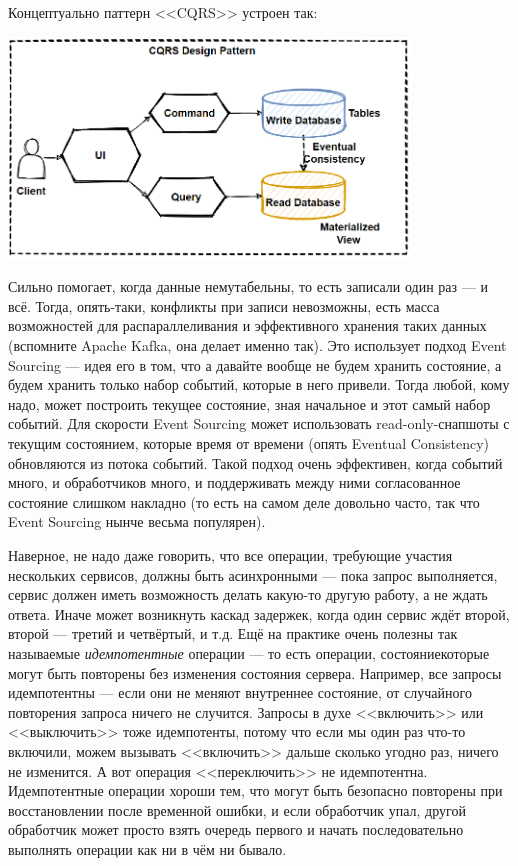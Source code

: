 \documentclass{../../text-style}
\begin{document}
Концептуально паттерн <<CQRS>> устроен так:

\begin{center}
    \includegraphics[width=0.8\textwidth]{cqrs.png}
\end{center}

Сильно помогает, когда данные немутабельны, то есть записали один раз --- и всё. Тогда, опять-таки, конфликты при записи невозможны, есть масса возможностей для распараллеливания и эффективного хранения таких данных (вспомните Apache Kafka, она делает именно так). Это использует подход Event Sourcing --- идея его в том, что а давайте вообще не будем хранить состояние, а будем хранить только набор событий, которые в него привели. Тогда любой, кому надо, может построить текущее состояние, зная начальное и этот самый набор событий. Для скорости Event Sourcing может использовать read-only-снапшоты с текущим состоянием, которые время от времени (опять Eventual Consistency) обновляются из потока событий. Такой подход очень эффективен, когда событий много, и обработчиков много, и поддерживать между ними согласованное состояние слишком накладно (то есть на самом деле довольно часто, так что Event Sourcing нынче весьма популярен).

Наверное, не надо даже говорить, что все операции, требующие участия нескольких сервисов, должны быть асинхронными --- пока запрос выполняется, сервис должен иметь возможность делать какую-то другую работу, а не ждать ответа. Иначе может возникнуть каскад задержек, когда один сервис ждёт второй, второй --- третий и четвёртый, и т.д. Ещё на практике очень полезны так называемые \emph{идемпотентные} операции --- то есть операции, состояниекоторые могут быть повторены без изменения состояния сервера. Например, все запросы идемпотентны --- если они не меняют внутреннее состояние, от случайного повторения запроса ничего не случится. Запросы в духе <<включить>> или <<выключить>> тоже идемпотенты, потому что если мы один раз что-то включили, можем вызывать <<включить>> дальше сколько угодно раз, ничего не изменится. А вот операция <<переключить>> не идемпотентна. Идемпотентные операции хороши тем, что могут быть безопасно повторены при восстановлении после временной ошибки, и если обработчик упал, другой обработчик может просто взять очередь первого и начать последовательно выполнять операции как ни в чём ни бывало.
\end{document}
